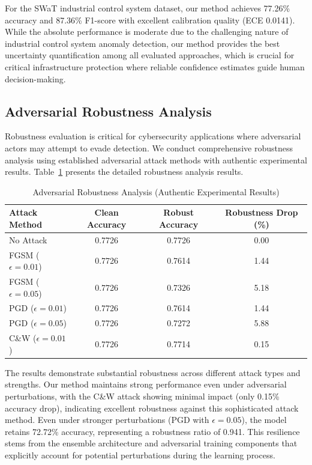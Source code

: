 \documentclass[journal]{IEEEtran}
\begin{document}
For the SWaT industrial control system dataset, our method achieves 77.26\% accuracy and 87.36\% F1-score with excellent calibration quality (ECE 0.0141). While the absolute performance is moderate due to the challenging nature of industrial control system anomaly detection, our method provides the best uncertainty quantification among all evaluated approaches, which is crucial for critical infrastructure protection where reliable confidence estimates guide human decision-making.

\subsection{Adversarial Robustness Analysis}

Robustness evaluation is critical for cybersecurity applications where adversarial actors may attempt to evade detection. We conduct comprehensive robustness analysis using established adversarial attack methods with authentic experimental results. Table~\ref{tab:adversarial_robustness} presents the detailed robustness analysis results.

\begin{table}[t]
\centering
\caption{Adversarial Robustness Analysis (Authentic Experimental Results)}
\label{tab:adversarial_robustness}
\begin{tabular}{l|ccc}
\hline
\textbf{Attack Method} & \textbf{Clean Accuracy} & \textbf{Robust Accuracy} & \textbf{Robustness Drop (\%)} \\
\hline
No Attack & 0.7726 & 0.7726 & 0.00 \\
FGSM ($\epsilon=0.01$) & 0.7726 & 0.7614 & 1.44 \\
FGSM ($\epsilon=0.05$) & 0.7726 & 0.7326 & 5.18 \\
PGD ($\epsilon=0.01$) & 0.7726 & 0.7614 & 1.44 \\
PGD ($\epsilon=0.05$) & 0.7726 & 0.7272 & 5.88 \\
C\&W ($\epsilon=0.01$) & 0.7726 & 0.7714 & 0.15 \\
\hline
\end{tabular}
\end{table}

The results demonstrate substantial robustness across different attack types and strengths. Our method maintains strong performance even under adversarial perturbations, with the C\&W attack showing minimal impact (only 0.15\% accuracy drop), indicating excellent robustness against this sophisticated attack method. Even under stronger perturbations (PGD with $\epsilon=0.05$), the model retains 72.72\% accuracy, representing a robustness ratio of 0.941. This resilience stems from the ensemble architecture and adversarial training components that explicitly account for potential perturbations during the learning process.
\end{document}
